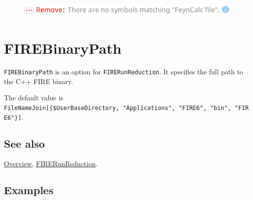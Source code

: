 \documentclass[../FeynHelpersManual.tex]{subfiles}
\begin{document}
\FloatBarrier
\begin{figure}[!ht]
\centering
\includegraphics[width=0.6\linewidth]{img/1klto42084vx8.pdf}
\end{figure}
\FloatBarrier

\hypertarget{firebinarypath}{
\section{FIREBinaryPath}\label{firebinarypath}}

\texttt{FIREBinaryPath} is an option for \texttt{FIRERunReduction}. It
specifies the full path to the C++ FIRE binary.

The default value is
\texttt{FileNameJoin[\allowbreak{}\{\allowbreak{}\$UserBaseDirectory,\ \allowbreak{}"Applications",\ \allowbreak{}"FIRE6",\ \allowbreak{}"bin",\ \allowbreak{}"FIRE6"\}]}.

\subsection{See also}

\hyperlink{toc}{Overview},
\hyperlink{firerunreduction}{FIRERunReduction}.

\subsection{Examples}
\end{document}
